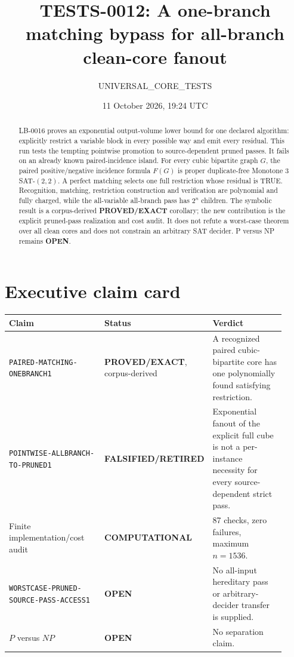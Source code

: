 \documentclass[11pt]{article}
\title{TESTS-0012: A one-branch matching bypass for all-branch clean-core fanout}
\author{UNIVERSAL\_CORE\_TESTS}
\date{11 October 2026, 19:24 UTC}
\newcommand{\EXACT}{\textbf{PROVED/EXACT}}
\newcommand{\COMP}{\textbf{COMPUTATIONAL}}
\newcommand{\OPEN}{\textbf{OPEN}}
\newcommand{\RETIRED}{\textbf{FALSIFIED/RETIRED}}
\begin{document}
\maketitle

\begin{abstract}
LB-0016 proves an exponential output-volume lower bound for one declared
algorithm: explicitly restrict a variable block in every possible way and
emit every residual.  This run tests the tempting pointwise promotion to
source-dependent pruned passes.  It fails on an already known paired-incidence
island.  For every cubic bipartite graph $G$, the paired positive/negative
incidence formula $F(G)$ is proper duplicate-free Monotone
$3$SAT-$(2,2)$.  A perfect matching selects one full restriction whose
residual is TRUE.  Recognition, matching, restriction construction and
verification are polynomial and fully charged, while the all-variable
all-branch pass has $2^n$ children.  The symbolic result is a corpus-derived
\EXACT{} corollary; the new contribution is the explicit pruned-pass
realization and cost audit.  It does not refute a worst-case theorem over all
clean cores and does not constrain an arbitrary SAT decider.  P versus NP
remains \OPEN.
\end{abstract}

\section{Executive claim card}

\begin{center}\small
\begin{tabular}{p{0.39\linewidth}p{0.20\linewidth}p{0.33\linewidth}}
\toprule
Claim & Status & Verdict\\
\midrule
\texttt{PAIRED-MATCHING-ONEBRANCH1} & \EXACT, corpus-derived &
A recognized paired cubic-bipartite core has one polynomially found
satisfying restriction.\\
\texttt{POINTWISE-ALLBRANCH-TO-PRUNED1} & \RETIRED &
Exponential fanout of the explicit full cube is not a per-instance
necessity for every source-dependent strict pass.\\
Finite implementation/cost audit & \COMP &
87 checks, zero failures, maximum $n=1536$.\\
\texttt{WORSTCASE-PRUNED-SOURCE-PASS-ACCESS1} & \OPEN &
No all-input hereditary pass or arbitrary-decider transfer is supplied.\\
$P$ versus $NP$ & \OPEN & No separation claim.\\
\bottomrule
\end{tabular}
\end{center}
\end{document}
